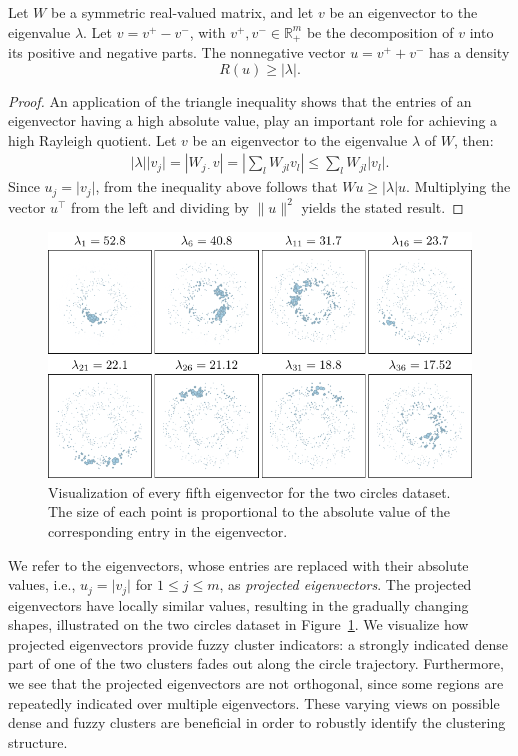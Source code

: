 \begin{observation}\label{thm:project}
Let $W$ be a symmetric real-valued matrix, and let $v$ be an eigenvector to the eigenvalue $\lambda$. Let $v=v^+-v^-$, with $v^+,v^-\in\mathbb{R}^m_+$ be the decomposition of $v$ into its positive and negative parts. The nonnegative vector $u =v^+ + v^-$ has a density 
\[R(u) \geq \lvert \lambda\rvert .\]
\end{observation}
\begin{proof}
An application of the triangle inequality shows that the entries of an eigenvector having a high absolute value, play an important role for achieving a high Rayleigh quotient. Let $v$ be an eigenvector to the eigenvalue $\lambda$ of $W$, then:
\begin{align}
\lvert \lambda\rvert  \lvert v_j\rvert  = \left\lvert W_{j\cdot}v\right\rvert  = \left\lvert \sum_{l}W_{jl}v_l\right\rvert  \leq 
\sum_{l}W_{jl}\lvert v_l\rvert . \label{eq:absEigen}
\end{align} 
Since $u_j=\lvert v_j\rvert $, from the inequality above follows that $Wu\geq\lvert \lambda\rvert  u$. Multiplying the vector $u^\top$ from the left and dividing by $\lVert u\rVert ^2$ yields the stated result.
\end{proof}
\begin{figure}[t]\centering
\includegraphics[width=\linewidth]{pics/SAProjEigen.pdf}
%
\caption{Visualization of every fifth eigenvector for the two circles dataset. The size of each point is proportional to the absolute value of the corresponding entry in the eigenvector.}
\label{fig:binaryEmb}
\end{figure}
We refer to the eigenvectors, whose entries are replaced with their absolute values, i.e., $u_j=\lvert v_j\rvert $ for $1\leq j\leq m$, as \emph{projected eigenvectors}. 
The projected eigenvectors have locally similar values, resulting in the gradually changing shapes, illustrated on the two circles dataset in Figure~\ref{fig:binaryEmb}. We visualize how projected eigenvectors provide fuzzy cluster indicators: a strongly indicated dense part of one of the two clusters fades out along the circle trajectory. Furthermore, we see that the projected eigenvectors are not orthogonal, since some regions are repeatedly indicated over multiple eigenvectors. These varying views on possible dense and fuzzy clusters are beneficial in order to robustly identify the clustering structure.   

